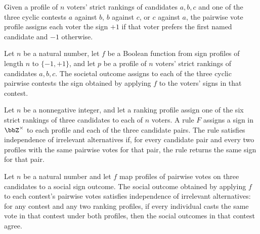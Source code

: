 \begin{definition}
\label{FABL.pairwiseVotes}
\leanok
{}
Given a profile of $n$ voters' strict rankings of candidates $a,b,c$ and one of the
three cyclic contests $a$ against $b$, $b$ against $c$, or $c$ against $a$, the pairwise
vote profile assigns each voter the sign $+1$ if that voter prefers the first named
candidate and $-1$ otherwise.
\end{definition}

\begin{definition}
\label{FABL.societalOutcome}
\leanok
{}
Let $n$ be a natural number, let $f$ be a Boolean function from sign profiles of length
$n$ to $\{ -1,+1 \}$, and let $p$ be a profile of $n$ voters' strict rankings of
candidates $a,b,c$. The societal outcome assigns to each of the three cyclic pairwise
contests the sign obtained by applying $f$ to the voters' signs in that contest.
\end{definition}

\begin{definition}
\label{FABL.SatisfiesIIA}
\leanok
{}
Let $n$ be a nonnegative integer, and let a ranking profile assign one of the six strict
rankings of three candidates to each of $n$ voters. A rule $F$ assigns a sign in
$\bbZ^\times$ to each profile and each of the three candidate pairs. The rule satisfies
independence of irrelevant alternatives if, for every candidate pair and every two
profiles with the same pairwise votes for that pair, the rule returns the same sign for
that pair.
\end{definition}

\begin{theorem}
\label{FABL.societalOutcome_satisfiesIIA}
\leanok
{}
Let $n$ be a natural number and let $f$ map profiles of pairwise votes on three
candidates to a social sign outcome. The social outcome obtained by applying $f$ to each
contest's pairwise votes satisfies independence of irrelevant alternatives: for any
contest and any two ranking profiles, if every individual casts the same vote in that
contest under both profiles, then the social outcomes in that contest agree.
\end{theorem}


